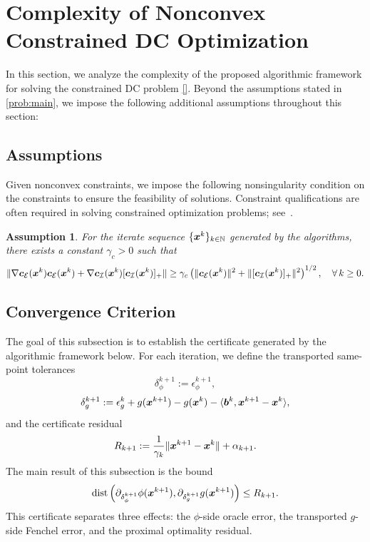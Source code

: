 \documentclass[english]{article}
\newtheorem{assumption}{Assumption}[section]
\begin{document}
\section{Complexity of Nonconvex Constrained DC Optimization}
\label{sec:complexity-analysis-NCDCA}
In this section, we analyze the complexity of the proposed algorithmic framework for solving the constrained DC problem \eqref{}. Beyond the assumptions stated in \eqref{prob:main}, we impose the following additional assumptions throughout this section:

\subsection{Assumptions}
Given nonconvex constraints, we impose the following nonsingularity condition on the constraints to ensure the feasibility of solutions. Constraint qualifications are often required in solving constrained optimization problems; see~\cite{shi2025momentum,lu2024variancereducedfirstordermethodsdeterministically,liu2025single,curtis2024worst}.
\begin{assumption}
    \label{Ass: constraints conditions} 
    {For the iterate sequence $\{\bm{x}^k\}_{k\in\mathbb{N}}$ generated by the algorithms,} there exists a constant $\gamma_c > 0$ such that
    \begin{align*}
        \|\nabla \bm{c}_{\mathcal{E}}(\bm{x}^k)\bm{c}_{\mathcal{E}}(\bm{x}^k)
        +\nabla \bm{c}_{\mathcal{I}}(\bm{x}^k)[\bm{c}_{\mathcal{I}}(\bm{x}^k)]_+\|
        \geq
        \gamma_c
        \left(\|\bm{c}_{\mathcal{E}}(\bm{x}^k)\|^2+\|[\bm{c}_{\mathcal{I}}(\bm{x}^k)]_+\|^2\right)^{1/2},
        \quad \forall\, k \geq 0.
    \end{align*}
\end{assumption}

\subsection{Convergence Criterion}
\label{subsec:Convergence Criterion of KKT}

The goal of this subsection is to establish the certificate generated by
the algorithmic framework below. For each iteration, we define
the transported same-point tolerances
\[
    \delta_\phi^{k+1}:=\epsilon_\phi^{k+1},
\]
\[
    \delta_g^{k+1}
    :=
    \epsilon_g^k
    +g(\bm{x}^{k+1})-g(\bm{x}^k)
    -\langle \bm{b}^k,\bm{x}^{k+1}-\bm{x}^k\rangle,
\]
and the certificate residual
\[
    R_{k+1}
    :=
    \frac{1}{\gamma_k}\|\bm{x}^{k+1}-\bm{x}^k\|
    +\alpha_{k+1}.
\]
The main result of this subsection is the bound
\[
    \operatorname{dist}
    \left(
        \partial_{\delta_\phi^{k+1}}\phi(\bm{x}^{k+1}),
        \partial_{\delta_g^{k+1}}g(\bm{x}^{k+1})
    \right)
    \le R_{k+1}.
\]
This certificate separates three effects: the $\phi$-side oracle error,
the transported $g$-side Fenchel error, and the proximal optimality
residual.
\end{document}
